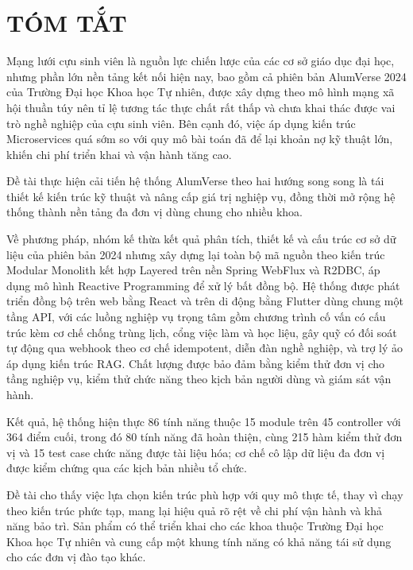 \documentclass[12pt,a4paper,oneside]{report}
\begin{document}
\newpage
\chapter*{TÓM TẮT}

Mạng lưới cựu sinh viên là nguồn lực chiến lược của các cơ sở giáo dục đại học, nhưng phần lớn nền tảng kết nối hiện nay, bao gồm cả phiên bản AlumVerse 2024 của Trường Đại học Khoa học Tự nhiên, được xây dựng theo mô hình mạng xã hội thuần túy nên tỉ lệ tương tác thực chất rất thấp và chưa khai thác được vai trò nghề nghiệp của cựu sinh viên. Bên cạnh đó, việc áp dụng kiến trúc Microservices quá sớm so với quy mô bài toán đã để lại khoản nợ kỹ thuật lớn, khiến chi phí triển khai và vận hành tăng cao.

Đề tài thực hiện cải tiến hệ thống AlumVerse theo hai hướng song song là tái thiết kế kiến trúc kỹ thuật và nâng cấp giá trị nghiệp vụ, đồng thời mở rộng hệ thống thành nền tảng đa đơn vị dùng chung cho nhiều khoa.

Về phương pháp, nhóm kế thừa kết quả phân tích, thiết kế và cấu trúc cơ sở dữ liệu của phiên bản 2024 nhưng xây dựng lại toàn bộ mã nguồn theo kiến trúc Modular Monolith kết hợp Layered trên nền Spring WebFlux và R2DBC, áp dụng mô hình Reactive Programming để xử lý bất đồng bộ. Hệ thống được phát triển đồng bộ trên web bằng React và trên di động bằng Flutter dùng chung một tầng API, với các luồng nghiệp vụ trọng tâm gồm chương trình cố vấn có cấu trúc kèm cơ chế chống trùng lịch, cổng việc làm và học liệu, gây quỹ có đối soát tự động qua webhook theo cơ chế idempotent, diễn đàn nghề nghiệp, và trợ lý ảo áp dụng kiến trúc RAG. Chất lượng được bảo đảm bằng kiểm thử đơn vị cho tầng nghiệp vụ, kiểm thử chức năng theo kịch bản người dùng và giám sát vận hành.

Kết quả, hệ thống hiện thực 86 tính năng thuộc 15 module trên 45 controller với 364 điểm cuối, trong đó 80 tính năng đã hoàn thiện, cùng 215 hàm kiểm thử đơn vị và 15 test case chức năng được tài liệu hóa; cơ chế cô lập dữ liệu đa đơn vị được kiểm chứng qua các kịch bản nhiều tổ chức.

Đề tài cho thấy việc lựa chọn kiến trúc phù hợp với quy mô thực tế, thay vì chạy theo kiến trúc phức tạp, mang lại hiệu quả rõ rệt về chi phí vận hành và khả năng bảo trì. Sản phẩm có thể triển khai cho các khoa thuộc Trường Đại học Khoa học Tự nhiên và cung cấp một khung tính năng có khả năng tái sử dụng cho các đơn vị đào tạo khác.
\end{document}
